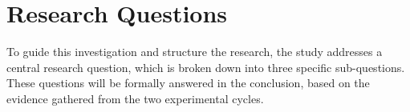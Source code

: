 

\section{Research Questions}

    To guide this investigation and structure the research, the study addresses a central research question, which is broken down into three specific sub-questions. These questions will be formally answered in the conclusion, based on the evidence gathered from the two experimental cycles.

